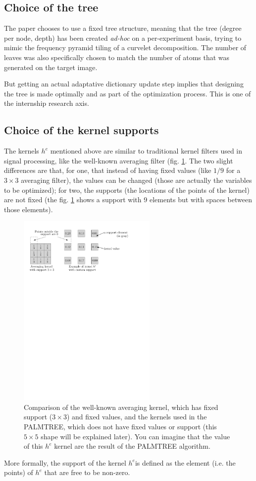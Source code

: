 \subsection{Choice of the tree}
The paper chooses to use a fixed tree structure, meaning that the tree (degree per node, depth) has been created \emph{ad-hoc} on a per-experiment basis, trying to mimic the frequency pyramid tiling of a curvelet decomposition. The number of leaves was also specifically chosen to match the number of atoms that was generated on the target image.

But getting an actual adaptative dictionary update step implies that designing the tree is made optimally and as part of the optimization process. This is one of the internship research axis.

\subsection{Choice of the kernel supports}
The kernels $h^e$ mentioned above are similar to traditional kernel filters used in signal processing, like the well-known averaging filter (fig. \ref{fig_example_kernel}. The two slight differences are that, for one, that instead of having fixed values (like $1/9$ for a $3\times3$ averaging filter), the values can be changed (those are actually the variables to be optimized); for two, the supports (the locations of the points of the kernel) are not fixed (the fig. \ref{fig_example_kernel} shows a support with 9 elements but with spaces between those elements).


\begin{figure}[!ht]\centering
\includegraphics[width=0.6\textwidth]{figures/example-kernel.pdf}
\caption{Comparison of the well-known averaging kernel, which has fixed support ($3\times3$) and fixed values, and the kernels used in the PALMTREE, which does not have fixed values or support (this $5\times5$ shape will be explained later). You can imagine that the value of this $h^e$ kernel are the result of the PALMTREE algorithm.\label{fig_example_kernel}}
\end{figure}
More formally, the support of the kernel $h^e$is defined as the element (i.e. the points) of $h^e$ that are free to be non-zero.

